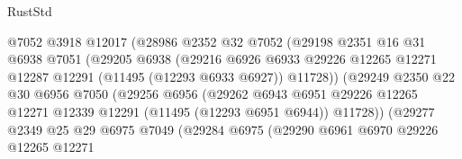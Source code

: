 \begin{lexlean}{RustStd}
\begin{coremodule}
                                @7052
                                @3918
                                @12017
                                (@28986
                                  @2352
                                  @32
                                  @7052
                                  (@29198
                                    @2351
                                    @16
                                    @31
                                    @6938
                                    @7051
                                    (@29205
                                      @6938
                                      (@29216
                                        @6926
                                        @6933
                                        @29226
                                        @12265
                                        @12271
                                        @12287
                                        @12291
                                        (@11495 (@12293 @6933 @6927))
                                        @11728))
                                    (@29249
                                      @2350
                                      @22
                                      @30
                                      @6956
                                      @7050
                                      (@29256
                                        @6956
                                        (@29262
                                          @6943
                                          @6951
                                          @29226
                                          @12265
                                          @12271
                                          @12339
                                          @12291
                                          (@11495 (@12293 @6951 @6944))
                                          @11728))
                                      (@29277
                                        @2349
                                        @25
                                        @29
                                        @6975
                                        @7049
                                        (@29284
                                          @6975
                                          (@29290
                                            @6961
                                            @6970
                                            @29226
                                            @12265
                                            @12271

\end{coremodule}
\end{lexlean}
